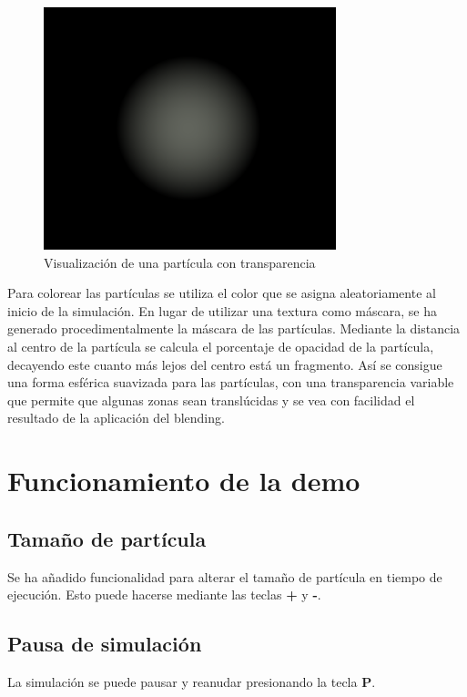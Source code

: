 \documentclass[10pt,oneside,a4paper]{article}
\begin{document}
\begin{figure}[h!tbp]
\centering
\includegraphics[width=.8\linewidth]{img/proceduraltexture.png}
\caption{Visualización de una partícula con transparencia}
\end{figure}
Para colorear las partículas se utiliza el color que se asigna aleatoriamente al inicio de la simulación. En lugar de utilizar una textura como máscara, se ha generado procedimentalmente la máscara de las partículas. Mediante la distancia al centro de la partícula se calcula el porcentaje de opacidad de la partícula, decayendo este cuanto más lejos del centro está un fragmento. Así se consigue una forma esférica suavizada para las partículas, con una transparencia variable que permite que algunas zonas sean translúcidas y se vea con facilidad el resultado de la aplicación del blending.

\section{Funcionamiento de la demo}
\subsection{Tamaño de partícula}
Se ha añadido funcionalidad para alterar el tamaño de partícula en tiempo de ejecución. Esto puede hacerse mediante las teclas \textbf{+} y \textbf{-}.

\subsection{Pausa de simulación}
La simulación se puede pausar y reanudar presionando la tecla \textbf{P}.
\end{document}
